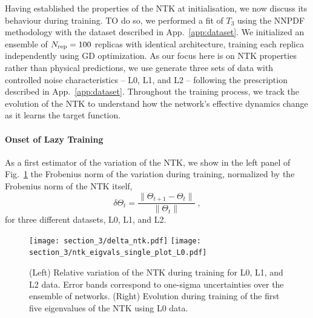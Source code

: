 Having established the properties of the NTK at initialisation, we now discuss
its behaviour during training. TO do so, we performed a fit of $T_3$ using the
NNPDF methodology with the dataset described in App.~\ref{app:dataset}. We
initialized an ensemble of $N_{\rm rep} = 100$ replicas with identical architecture,
training each replica independently using GD optimization. As our focus here is
on NTK properties rather than physical predictions, we use generate three sets
of data with controlled noise characteristics -- L0, L1, and L2 -- following the
prescription described in App.~\ref{app:dataset}. Throughout the training
process, we track the evolution of the NTK to understand how the network's
effective dynamics change as it learns the target function.

\paragraph{Onset of Lazy Training} 

As a first estimator of the variation of the NTK, we show in the left panel of
Fig.~\ref{fig:NTKTime} the Frobenius norm of the variation during training,
normalized by the Frobenius norm of the NTK itself, 
\begin{equation}
\delta \Theta_t = \frac{\lVert \Theta_{t+1} - \Theta_t \rVert}{\lVert \Theta_t \rVert} \;,
\label{eq:DeltaNTK}
\end{equation}
for three different datasets, L0, L1, and L2. 

\begin{figure}[t]
  \centering
  \texttt{[image: section\_3/delta\_ntk.pdf]}
  \texttt{[image: section\_3/ntk\_eigvals\_single\_plot\_L0.pdf]} 
  \caption{(Left) Relative variation of the NTK during training for L0, L1, and
  L2 data. Error bands correspond to one-sigma uncertainties over the ensemble
  of networks. (Right) Evolution during training of the first five eigenvalues
  of the NTK using L0 data.}
  \label{fig:NTKTime}
\end{figure}

